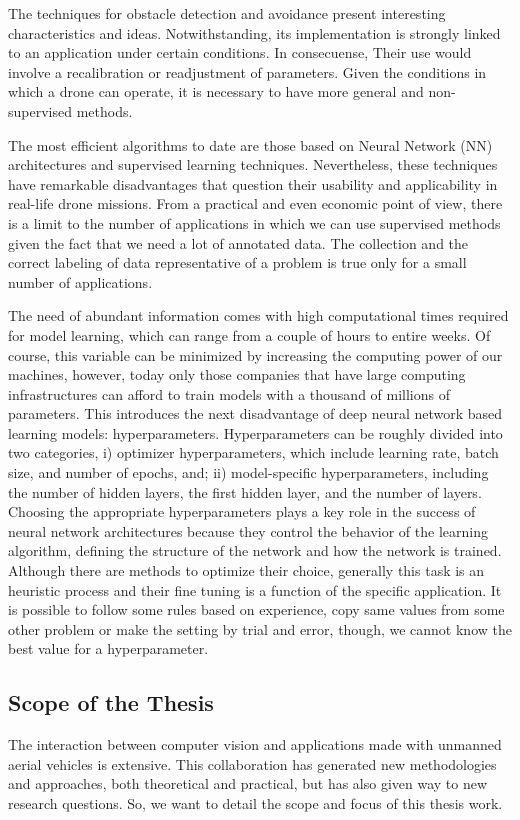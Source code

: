 The techniques for obstacle detection and avoidance present interesting characteristics and ideas. Notwithstanding, its implementation is strongly linked to an application under certain conditions. In consecuense, Their use would involve a recalibration or readjustment of parameters. Given the conditions in which a drone can operate, it is necessary to have more general and non-supervised methods.

The most efficient algorithms to date are those based on Neural Network (NN) architectures and supervised learning techniques. Nevertheless, these techniques have remarkable disadvantages that question their usability and applicability in real-life drone missions. 
From a practical and even economic point of view, there is a limit to the number of applications in which we can use supervised methods given the fact that we need a lot of annotated data. The collection and the correct labeling of data representative of a problem is true only for a small number of applications. 

The need of abundant information comes with high computational times required for model learning, which can range from a couple of hours to entire weeks. Of course, this variable can be minimized by increasing the computing power of our machines, however, today only those companies that have large computing infrastructures can afford to train models with a thousand of millions of parameters. 
This introduces the next disadvantage of deep neural network based learning models: hyperparameters. Hyperparameters can be roughly divided into two categories, i) optimizer hyperparameters, which include learning rate, batch size, and number of epochs, and; ii) model-specific hyperparameters, including the number of hidden layers, the first hidden layer, and the number of layers. Choosing the appropriate hyperparameters plays a key role in the success of neural network architectures because they control the behavior of the learning algorithm, defining the structure of the network and how the network is trained. Although there are methods to optimize their choice, generally this task is an heuristic process and their fine tuning is a function of the specific application. It is possible to follow some rules based on experience, copy same values from some other problem or make the setting by trial and error, though, we cannot know the best value for a hyperparameter.

\subsection*{Scope of the Thesis}
The interaction between computer vision and applications made with unmanned aerial vehicles is extensive. This collaboration has generated new methodologies and approaches, both theoretical and practical, but has also given way to new research questions. So, we want to detail the scope and focus of this thesis work.

